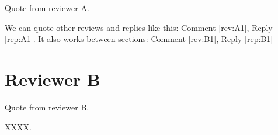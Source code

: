 \documentclass[11pt]{article}
\newcounter{reviewer} %
\newcounter{review}[section]
\newcounter{reply}[section]
\newcommand{\refrep}[1]{Reply \ref{#1}}
\newcommand{\refrev}[1]{Comment \ref{#1}}
\begin{document}
\begin{review}
Quote from reviewer A.
\end{review}

\begin{reply}
 We can quote other reviews and replies like this: \refrev{rev:A1}, \refrep{rep:A1}.
It also works between sections: \refrev{rev:B1}, \refrep{rep:B1}
\end{reply}


\section{Reviewer B}
\label{sec:B}

\begin{review}
\label{rev:B1}
Quote from reviewer B.
\end{review}

\begin{reply}
\label{rep:B1}
XXXX.
\end{reply}
\end{document}
